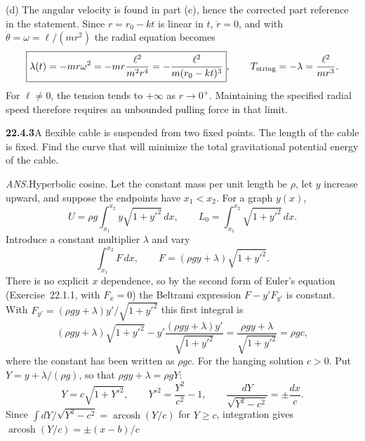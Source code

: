 (d) The angular velocity is found in part (c), hence the corrected
part reference in the statement. Since $r=r_0-kt$ is linear in $t$,
$\ddot r=0$, and with $\dot\theta=\omega=\ell/(mr^2)$ the radial
equation becomes
\[
 \boxed{\lambda(t)=-mr\omega^2=-mr\frac{\ell^2}{m^2r^4}
       =-\frac{\ell^2}{m(r_0-kt)^3}},\qquad
 T_{\rm string}=-\lambda=\frac{\ell^2}{mr^3}.
\]
For $\ell\ne0$, the tension tends to $+\infty$ as $r\to0^+$.
Maintaining the specified radial speed therefore requires an
unbounded pulling force in that limit.


\par\bigskip
\noindent\textbf{22.4.3}\quad A flexible cable is suspended from
two fixed points. The length of the cable is fixed. Find the
curve that will minimize the total gravitational potential
energy of the cable.
\par\nobreak\hfill\emph{ANS.}\enspace Hyperbolic cosine.
\solution
{}
Let the constant mass per unit length be $\rho$, let $y$ increase
upward, and suppose the endpoints have $x_1<x_2$.  For a graph $y(x)$,
\[
 U=\rho g\int_{x_1}^{x_2}y\sqrt{1+y'^2}\,dx,\qquad
 L_0=\int_{x_1}^{x_2}\sqrt{1+y'^2}\,dx.
\]
Introduce a constant multiplier $\lambda$ and vary
\[
 \int_{x_1}^{x_2}F\,dx,\qquad F=(\rho gy+\lambda)\sqrt{1+y'^2}.
\]
There is no explicit $x$ dependence, so by the second form of Euler's
equation (Exercise~22.1.1, with $F_x=0$) the Beltrami expression
$F-y'F_{y'}$ is constant. With
$F_{y'}=(\rho gy+\lambda)y'/\sqrt{1+y'^2}$ this first integral is
\[
 (\rho gy+\lambda)\sqrt{1+y'^2}
 -y'\frac{(\rho gy+\lambda)y'}{\sqrt{1+y'^2}}
 =\frac{\rho gy+\lambda}{\sqrt{1+y'^2}}
 =\rho gc,
\]
where the constant has been written as $\rho gc$.
For the hanging solution $c>0$.  Put $Y=y+\lambda/(\rho g)$, so that
$\rho gy+\lambda=\rho gY$:
\[
 Y=c\sqrt{1+Y'^2},\qquad Y'^2=\frac{Y^2}{c^2}-1,\qquad
 \frac{dY}{\sqrt{Y^2-c^2}}=\pm\frac{dx}{c}.
\]
Since $\int dY/\sqrt{Y^2-c^2}=\operatorname{arcosh}(Y/c)$ for
$Y\ge c$, integration gives $\operatorname{arcosh}(Y/c)=\pm(x-b)/c$
